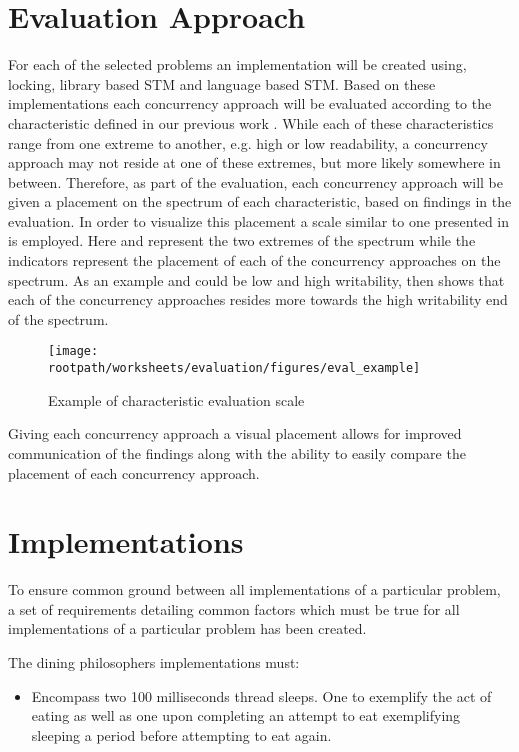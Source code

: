 \section{Evaluation Approach}
For each of the selected problems an implementation will be created using, locking, library based \ac{STM} and language based \ac{STM}. Based on these implementations each concurrency approach will be evaluated according to the characteristic defined in our previous work 
\cite[p. 15-21]{dpt907e14trending}. While each of these characteristics range from one extreme to another, e.g. high or low readability, a concurrency approach may not reside at one of these extremes, but more likely somewhere in between. Therefore, as part of the evaluation, each concurrency approach will be given a placement on the spectrum of each characteristic, based on findings in the evaluation. In order to visualize this placement a scale similar to one presented in  is employed. Here  and  represent the two extremes of the spectrum while the indicators represent the placement of each of the concurrency approaches on the spectrum. As an example  and  could be low and high writability,  then shows that each of the concurrency approaches resides more towards the high writability end of the spectrum.
\begin{figure}[ht!]
\centering
\texttt{[image: \\rootpath/worksheets/evaluation/figures/eval\_example]}
\caption{Example of characteristic evaluation scale}\label{fig:evel_example}
\end{figure}
Giving each concurrency approach a visual placement allows for improved communication of the findings along with the ability to easily compare the placement of each concurrency approach.

\section{Implementations}
To ensure common ground between all implementations of a particular problem, a set of requirements detailing common factors which must be true for all implementations of a particular problem has been created.

The dining philosophers implementations must:
\begin{itemize}
	\item Encompass two 100 milliseconds thread sleeps. One to exemplify the act of eating as well as one upon completing an attempt to eat exemplifying sleeping a period before attempting to eat again.
\end{itemize}

